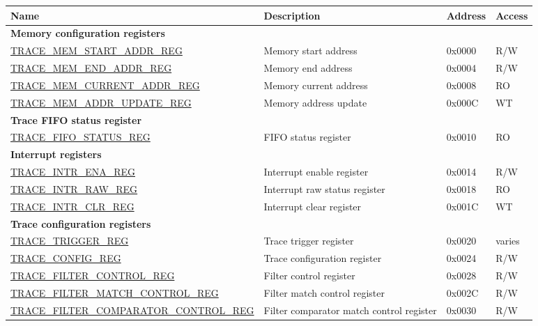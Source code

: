 \begin{longtable}{ | p{7.2cm} | p{6cm} | p{1.3cm} | p{1cm} | }
\hline\rowcolor{lightgray}
\textbf{Name} & \textbf{Description} &  \textbf{Address} & \textbf{Access} \\ \hline
\endhead
\multicolumn{4}{|l|}{\textbf{Memory configuration registers}} \\ \hline
\hyperref[regdesc:TRACEMEMSTARTADDRREG]{TRACE\_MEM\_START\_ADDR\_REG} & Memory start address & 0x0000 & R/W \\ \hline
\hyperref[regdesc:TRACEMEMENDADDRREG]{TRACE\_MEM\_END\_ADDR\_REG} & Memory end address & 0x0004 & R/W \\ \hline
\hyperref[regdesc:TRACEMEMCURRENTADDRREG]{TRACE\_MEM\_CURRENT\_ADDR\_REG} & Memory current address & 0x0008 & RO \\ \hline
\hyperref[regdesc:TRACEMEMADDRUPDATEREG]{TRACE\_MEM\_ADDR\_UPDATE\_REG} & Memory address update & 0x000C & WT \\ \hline
\multicolumn{4}{|l|}{\textbf{Trace FIFO status register}} \\ \hline
\hyperref[regdesc:TRACEFIFOSTATUSREG]{TRACE\_FIFO\_STATUS\_REG} & FIFO status register & 0x0010 & RO \\ \hline
\multicolumn{4}{|l|}{\textbf{Interrupt registers}} \\ \hline
\hyperref[regdesc:TRACEINTRENAREG]{TRACE\_INTR\_ENA\_REG} & Interrupt enable register & 0x0014 & R/W \\ \hline
\hyperref[regdesc:TRACEINTRRAWREG]{TRACE\_INTR\_RAW\_REG} & Interrupt raw status register & 0x0018 & RO \\ \hline
\hyperref[regdesc:TRACEINTRCLRREG]{TRACE\_INTR\_CLR\_REG} & Interrupt clear register & 0x001C & WT \\ \hline
\multicolumn{4}{|l|}{\textbf{Trace configuration registers}} \\ \hline
\hyperref[regdesc:TRACETRIGGERREG]{TRACE\_TRIGGER\_REG} & Trace trigger register & 0x0020 & varies \\ \hline
\hyperref[regdesc:TRACECONFIGREG]{TRACE\_CONFIG\_REG} & Trace configuration register & 0x0024 & R/W \\ \hline
\hyperref[regdesc:TRACEFILTERCONTROLREG]{TRACE\_FILTER\_CONTROL\_REG} & Filter control register & 0x0028 & R/W \\ \hline
\hyperref[regdesc:TRACEFILTERMATCHCONTROLREG]{TRACE\_FILTER\_MATCH\_CONTROL\_REG} & Filter match control register & 0x002C & R/W \\ \hline
\hyperref[regdesc:TRACEFILTERCOMPARATORCONTROLREG]{TRACE\_FILTER\_COMPARATOR\_CONTROL\_REG} & Filter comparator match control register & 0x0030 & R/W \\ \hline

\end{longtable}
